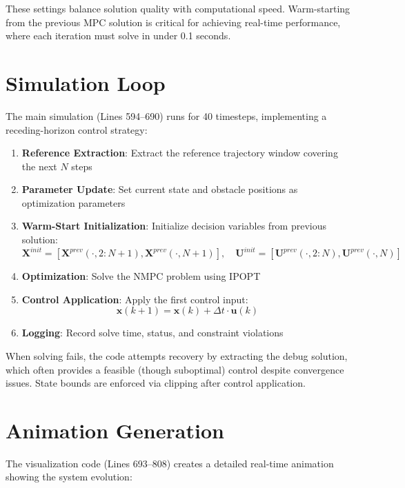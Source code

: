 \documentclass[12pt,a4paper]{article}
\begin{document}
These settings balance solution quality with computational speed. Warm-starting from the previous MPC solution is critical for achieving real-time performance, where each iteration must solve in under 0.1 seconds.

\section{Simulation Loop}

The main simulation (Lines 594--690) runs for 40 timesteps, implementing a receding-horizon control strategy:

\begin{enumerate}
    \item \textbf{Reference Extraction}: Extract the reference trajectory window covering the next $N$ steps
    
    \item \textbf{Parameter Update}: Set current state and obstacle positions as optimization parameters
    
    \item \textbf{Warm-Start Initialization}: Initialize decision variables from previous solution:
    \[
    \mathbf{X}^{init} = [\mathbf{X}^{prev}(\cdot, 2:N+1), \mathbf{X}^{prev}(\cdot, N+1)], \quad \mathbf{U}^{init} = [\mathbf{U}^{prev}(\cdot, 2:N), \mathbf{U}^{prev}(\cdot, N)]
    \]
    
    \item \textbf{Optimization}: Solve the NMPC problem using IPOPT
    
    \item \textbf{Control Application}: Apply the first control input:
    \[
    \mathbf{x}(k+1) = \mathbf{x}(k) + \Delta t \cdot \mathbf{u}(k)
    \]
    
    \item \textbf{Logging}: Record solve time, status, and constraint violations
\end{enumerate}

When solving fails, the code attempts recovery by extracting the debug solution, which often provides a feasible (though suboptimal) control despite convergence issues. State bounds are enforced via clipping after control application.

\section{Animation Generation}

The visualization code (Lines 693--808) creates a detailed real-time animation showing the system evolution:
\end{document}
